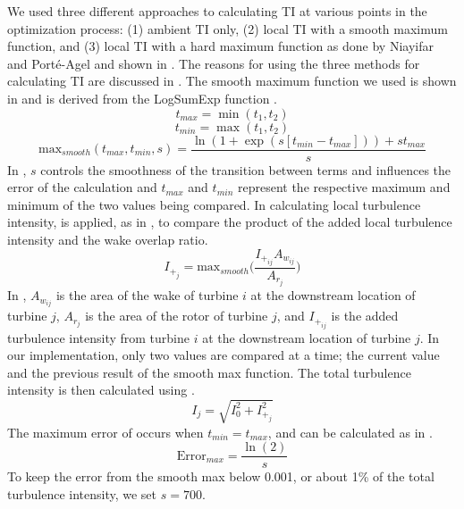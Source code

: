 \documentclass[conf]{new-aiaa}
\begin{document}
We used three different approaches to calculating TI at various points in the optimization process: (1) ambient TI only, (2) local TI with a smooth maximum function, and (3) local TI with a hard maximum function as done by Niayifar and Port\'{e}-Agel \cite{niayifar2016} and shown in . The reasons for using the three methods for calculating TI are discussed in . The smooth maximum function we used is shown in  and is derived from the LogSumExp function \cite{cook2010-softmaximum}.
%
\begin{equation}\label{eq:smoothmax1}
    t_{max} = \min(t_1, t_2)
\end{equation}
\begin{equation}\label{eq:smoothmax2}
    t_{min} = \max(t_1, t_2)
\end{equation}
\begin{equation}\label{eq:smoothmax3}
  \text{max}_{smooth}(t_{max},t_{min},s) = \frac{\ln(1+\exp(s[t_{min}-t_{max}]))+s t_{max}}{s}
\end{equation}
%
In , $s$ controls the smoothness of the transition between terms and influences the error of the calculation and $t_{max}$ and $t_{min}$ represent the respective maximum and minimum of the two values being compared. In calculating local turbulence intensity,  is applied, as in  , to compare the product of the added local turbulence intensity and the wake overlap ratio.
%
\begin{equation}\label{eq:maxti}
    I_{+_j} = \text{max}_{smooth}{\bigg(\frac{I_{+_{ij}}A_{w_{ij}}}{A_{r_j}}\bigg)}
\end{equation}
%
In , $A_{w_{ij}}$ is the area of the wake of turbine $i$ at the downstream location of turbine $j$, $A_{r_j}$ is the area of the rotor of turbine $j$, and $I_{+_{ij}}$ is the added turbulence intensity from turbine $i$ at the downstream location of turbine $j$. In our implementation, only two values are compared at a time; the current value and the previous result of the smooth max function. The total turbulence intensity is then calculated using .
%
\begin{equation}\label{eq:ti_at_turb}
    I_j = \sqrt{I_0^2+I_{+_j}^2}
\end{equation}
%
The maximum error of  occurs when $t_{min} = t_{max}$, and can be calculated as in .
%
\begin{equation}\label{eq:error_max}
	\text{Error}_{max} = \frac{\ln{(2)}}{s}
\end{equation}
%
To keep the error from the smooth max below 0.001, or about 1\% of the total turbulence intensity, we set $s=700$.
\end{document}
